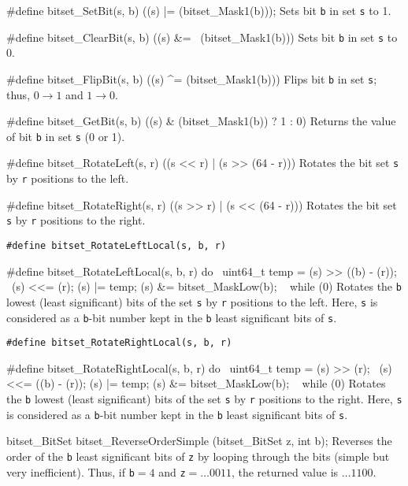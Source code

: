 #define bitset_SetBit(s, b) ((s) |= (bitset_Mask1(b)));
\endcode
 \tab  Sets bit {\tt b} in set  {\tt s}  to 1.
 \endtab
\code

#define bitset_ClearBit(s, b) ((s) &= ~(bitset_Mask1(b)))
\endcode
 \tab  Sets bit {\tt b} in set  {\tt s}  to 0.
 \endtab
\code

#define bitset_FlipBit(s, b) ((s) ^= (bitset_Mask1(b)))
\endcode
 \tab  Flips bit {\tt b} in set {\tt s};  thus,
        $0 \rightarrow 1$ and $1 \rightarrow 0$.
 \endtab
\code

#define bitset_GetBit(s, b)  ((s) & (bitset_Mask1(b)) ? 1 : 0)
\endcode
 \tab  Returns the value of bit {\tt b} in set {\tt s} (0 or 1).
 \endtab
\code

#define bitset_RotateLeft(s, r)  ((s << r) | (s >> (64 - r)))
\endcode
 \tab  Rotates the bit set {\tt s} by {\tt r} positions to the left.
 \endtab
\code

#define bitset_RotateRight(s, r)  ((s >> r) | (s << (64 - r)))
\endcode
 \tab  Rotates the bit set {\tt s} by {\tt r} positions to the right.
\endtab

\noindent
{\tt\#define bitset\_RotateLeftLocal(s, b, r)}

\hide\code
#define bitset_RotateLeftLocal(s, b, r) do { \
   uint64_t temp = (s) >> ((b) - (r)); \
   (s) <<= (r);   (s) |= temp;   (s) &= bitset_MaskLow(b); \
   } while (0)
\endcode\endhide
\tab  Rotates the {\tt b} lowest (least significant) bits of
  the set {\tt s} by {\tt r} positions to the left.
  Here, {\tt s} is considered as a {\tt b}-bit number kept
  in the {\tt b} least significant bits of {\tt s}.
 \endtab

\noindent
{\tt\#define bitset\_RotateRightLocal(s, b, r)}

\hide\code
#define bitset_RotateRightLocal(s, b, r) do { \
   uint64_t temp = (s) >> (r); \
   (s) <<= ((b) - (r));   (s) |= temp;   (s) &= bitset_MaskLow(b); \
   } while (0)
\endcode\endhide
 \tab  Rotates the {\tt b} lowest (least significant) bits of
  the set {\tt s} by {\tt r} positions to the right.
  Here, {\tt s} is considered as a {\tt b}-bit number kept
  in the {\tt b} least significant bits of {\tt s}.
 \endtab


\guisec{Prototypes}
\code

bitset_BitSet bitset_ReverseOrderSimple (bitset_BitSet z, int b);
\endcode
\tab Reverses the order of the {\tt b} least significant bits of {\tt z} by looping
    through the bits (simple but very inefficient). Thus, if {\tt b}${}=4$ and
    {\tt z}${} = \dots 0011$, the returned value is $\dots 1100$.
 \endtab
\code

